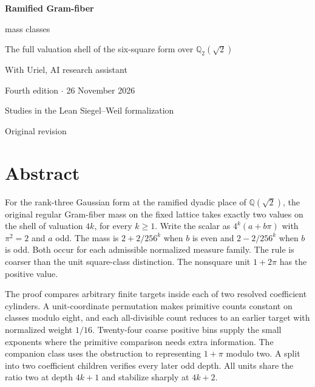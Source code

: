 \documentclass[12pt,letterpaper]{article}
\newcommand{\code}[1]{\texttt{\detokenize{#1}}}
\begin{document}
\thispagestyle{empty}
\begin{center}\par\vspace{.46in}
{\fontsize{30}{35}\selectfont\bfseries\color{ink}Ramified Gram-fiber\par mass classes}\par\vspace{.23in}
\begin{minipage}{.87\linewidth}\centering\Large The full valuation shell of the six-square form over $\mathbb Q_2(\sqrt{2})$\end{minipage}
\par\vspace{.35in}
\par\vspace{.45in}{\large Justin Candler}\par With Uriel, AI research assistant\par Fourth edition $\cdot$ 26 November 2026\end{center}\vfill
\begin{center}\sffamily Studies in the Lean Siegel--Weil formalization\par\small Original revision \code{40e56bab}\end{center}
\clearpage\section*{Abstract}
For the rank-three Gaussian form at the ramified dyadic place of $\mathbb Q(\sqrt2)$, the original regular Gram-fiber mass on the fixed lattice takes exactly two values on the shell of valuation $4k$, for every $k\geq1$. Write the scalar as $4^k(a+b\pi)$ with $\pi^2=2$ and $a$ odd. The mass is $2+2/256^k$ when $b$ is even and $2-2/256^k$ when $b$ is odd. Both occur for each admissible normalized measure family. The rule is coarser than the unit square-class distinction. The nonsquare unit $1+2\pi$ has the positive value.
\par
The proof compares arbitrary finite targets inside each of two resolved coefficient cylinders. A unit-coordinate permutation makes primitive counts constant on classes modulo eight, and each all-divisible count reduces to an earlier target with normalized weight $1/16$. Twenty-four coarse positive bins supply the small exponents where the primitive comparison needs extra information. The companion class uses the obstruction to representing $1+\pi$ modulo two. A split into two coefficient children verifies every later odd depth. All units share the ratio two at depth $4k+1$ and stabilize sharply at $4k+2$.
\end{document}

